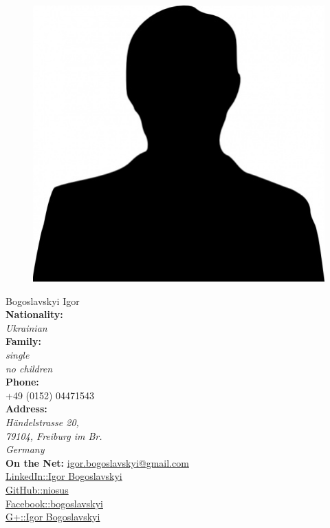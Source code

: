 \documentclass[a4paper,12pt,final]{memoir}
\newcommand{\SmallSep}{\vspace{0.5em}}
\begin{document}
\begin{figure}
	\hfill
	\includegraphics[width=0.6\columnwidth]{photo.jpg}
	\vspace{-6cm}
\end{figure}

\begin{flushright}\small
	Bogoslavskyi Igor\\
	\textbf{Nationality:} \emph{\\Ukrainian\\}
	\textbf{Family:} \emph{\\single \\no children\\}
	\SmallSep
	\textbf{Phone:}\\
	+49 (0152) 04471543\\
	\textbf{Address:}\\ \emph{H\"{a}ndelstrasse 20, \\79104, Freiburg im Br. \\Germany}\\
	\SmallSep
	\textbf{On the Net:}
	\href{mailto:igor.bogoslavskyi@gmail.com}{igor.bogoslavskyi@gmail.com}\\ 
	\SmallSep
	\href{http://www.linkedin.com/pub/igor-bogoslavskyi/43/50b/726}{LinkedIn::Igor Bogoslavskyi}\\ 
	\SmallSep
	\href{https://github.com/niosus}{GitHub::niosus}\\
	\SmallSep
	\href{https://www.facebook.com/bogoslavskyi}{Facebook::bogoslavskyi}\\ 
	\SmallSep
	\href{https://plus.google.com/118159072920638602239/posts}{G+::Igor Bogoslavskyi}\\ 
	\SmallSep
\end{flushright}\normalsize
\framebreak
\end{document}
